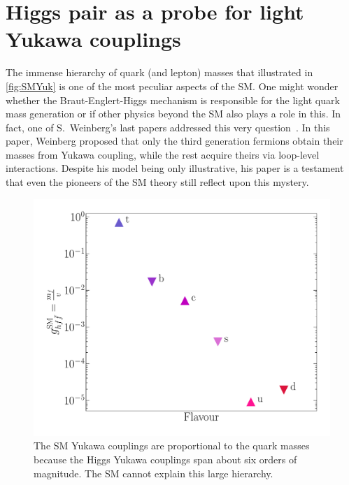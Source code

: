 
\chapter{ Higgs pair as a probe for light Yukawa couplings }\label{chap:lightyuk}
\par The immense hierarchy of quark (and lepton) masses that illustrated in~ \autoref{fig:SMYuk} is one of the most peculiar aspects of the SM.  One might wonder whether the Braut-Englert-Higgs mechanism is responsible for the light quark mass generation or if other physics  beyond the SM also plays a role in this. In fact, one of S.~Weinberg's last papers addressed this very question~\cite{Weinberg:2020zba}. In this paper, Weinberg proposed that only the third generation fermions obtain their masses from Yukawa coupling, while the rest acquire theirs via loop-level interactions. Despite his model being only illustrative, his paper is a testament that even the pioneers of the SM theory still reflect upon this mystery. \\
\begin{figure}[htpb!]
	\centering
	\includegraphics[width=0.5\linewidth]{./figures/yukawa}
	\caption{The SM Yukawa couplings are proportional to the quark masses because the Higgs Yukawa couplings span about six orders of magnitude. The SM cannot explain this large hierarchy. } 
	\label{fig:SMYuk}
\end{figure}
